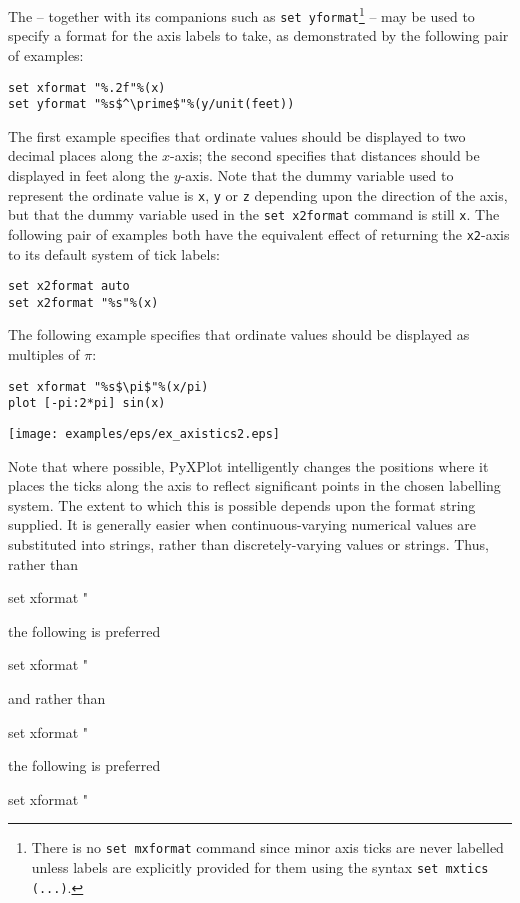 The  -- together with its companions such as {\tt set
yformat}\footnote{There is no {\tt set mxformat} command since minor axis ticks
are never labelled unless labels are explicitly provided for them using the
syntax {\tt set mxtics (...)}.} -- may be used to specify a format for the axis
labels to take, as demonstrated by the following pair of examples:
\begin{verbatim}
set xformat "%.2f"%(x)
set yformat "%s$^\prime$"%(y/unit(feet))
\end{verbatim}
The first example specifies that ordinate values should be displayed to two
decimal places along the $x$-axis; the second specifies that distances should
be displayed in feet along the $y$-axis. Note that the dummy variable used to
represent the ordinate value is {\tt x}, {\tt y} or {\tt z} depending upon the
direction of the axis, but that the dummy variable used in the {\tt set
x2format} command is still {\tt x}. The following pair of examples both have
the equivalent effect of returning the {\tt x2}-axis to its default system of
tick labels:
\begin{verbatim}
set x2format auto
set x2format "%s"%(x)
\end{verbatim}

The following example specifies that ordinate values should be displayed as
multiples of $\pi$:
\begin{verbatim}
set xformat "%s$\pi$"%(x/pi)
plot [-pi:2*pi] sin(x)
\end{verbatim}

\noindent\centerline{\texttt{[image: examples/eps/ex\_axistics2.eps]}}

Note that where possible, PyXPlot intelligently changes the positions where it
places the ticks along the axis to reflect significant points in the chosen
labelling system.  The extent to which this is possible depends upon the format
string supplied. It is generally easier when continuous-varying numerical
values are substituted into strings, rather than discretely-varying values or
strings. Thus, rather than
\begin{dontdo}
set xformat "%
\end{dontdo}
the following is preferred
\begin{dontdo}
set xformat "%
\end{dontdo}
and rather than
\begin{dontdo}
set xformat "%
\end{dontdo}
the following is preferred
\begin{dontdo}
set xformat "%
\end{dontdo}


